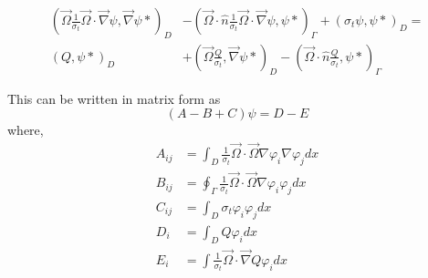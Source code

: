 \begin{align*}
        \left ( \vec{\Omega}\frac{1}{\sigma_t}\vec{\Omega}\cdot \vec{\nabla}\psi, \vec{\nabla}\psi* \right)_D &-     \left ( \vec{\Omega}\cdot \hat{n} \frac{1}{\sigma_t}\vec{\Omega} \cdot \vec{\nabla} \psi,\psi* \right)_{\Gamma} + \left ( \sigma_t \psi, \psi* \right )_D = \\
        \left ( Q, \psi* \right)_D &+ \left ( \vec{\Omega} \frac{Q}{\sigma_t}, \vec{\nabla}\psi* \right)_D - \left ( \vec{\Omega}\cdot \hat{n} \frac{Q}{\sigma_t}, \psi* \right)_{\Gamma} 
\end{align*}

This can be written in matrix form as
\begin{equation}
    (A - B + C)\psi = D - E
\end{equation}
where,
\begin{align*}
    A_{ij} &= \int_{D}\frac{1}{\sigma_t}\vec{\Omega}\cdot \vec{\Omega} \nabla \varphi_i \nabla \varphi_j dx \\
    B_{ij} &= \oint_{\Gamma} \frac{1}{\sigma_t}\vec{\Omega}\cdot \vec{\Omega} \nabla \varphi_i \varphi_j dx \\
    C_{ij} &= \int_{D}\sigma_t \varphi_i \varphi_j dx \\
    D_i &= \int_D Q\varphi_i dx \\
    E_i &= \int \frac{1}{\sigma_t} \vec{\Omega}\cdot \vec{\nabla} Q \varphi_i dx
\end{align*}
